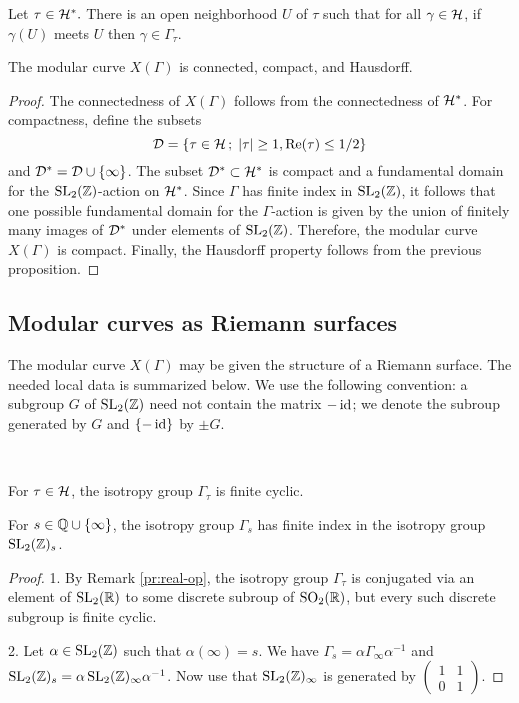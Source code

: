 \begin{cor} \label{pr:chart-nhood}
 Let $\tau\in\mathcal{H}^*.$ There is an open neighborhood $U$ of $\tau$ such that for all $\gamma\in\mathcal{H}$, if $\gamma(U)$ meets $U$ then $\gamma\in\Gamma_\tau$.
\end{cor}

\begin{prop}
 The modular curve $X(\Gamma)$ is connected, compact, and Hausdorff.
\end{prop}

\begin{proof}
 The connectedness of $X(\Gamma)$ follows from the connectedness of $\mathcal{H}^*$. For compactness, define the subsets
 \[\mathcal{D}=\{\tau\in\mathcal{H}\,;\; |\tau|\geq 1, \operatorname{Re}(\tau)\leq 1/2\}\] and $\mathcal{D}^*=\mathcal{D}\cup\{\infty\}$. The subset $\mathcal{D}^*\subset\mathcal{H}^*$ is compact and a fundamental domain for the $\operatorname{SL}_2(\mathbb{Z})$-action on $\mathcal{H}^*$. Since $\Gamma$ has finite index in $\operatorname{SL}_2(\mathbb{Z})$, it follows that one possible fundamental domain for the $\Gamma$-action is given by the union of finitely many images of $\mathcal{D}^*$ under elements of $\operatorname{SL}_2(\mathbb{Z})$. Therefore, the modular curve $X(\Gamma)$ is compact. Finally, the Hausdorff property follows from the previous proposition. 
\end{proof}

\subsection{Modular curves as Riemann surfaces}

The modular curve $X(\Gamma)$ may be given the structure of a Riemann surface. The needed local data is summarized below. We use the following convention: a subgroup $G$ of $\operatorname{SL}_2(\mathbb{Z})$ need not contain the matrix $-\operatorname{id}$; we denote the subroup generated by $G$ and $\{-\operatorname{id}\}$ by $\pm G$.

\begin{prop} \ 

  For $\tau\in\mathcal{H}$, the isotropy group $\Gamma_\tau$ is finite cyclic.
 
  For $s\in\mathbb{Q}\cup\{\infty\}$, the isotropy group $\Gamma_s$ has finite index in the isotropy group $\operatorname{SL}_2(\mathbb{Z})_s$.
\end{prop}

\begin{proof}

 1. By Remark \ref{pr:real-op}, the isotropy group $\Gamma_\tau$ is conjugated via an element of $\operatorname{SL}_2(\mathbb{R})$ to some discrete subroup of $\operatorname{SO}_2(\mathbb{R})$, but every such discrete subgroup is finite cyclic.
 
 2. Let $\alpha\in\operatorname{SL}_2(\mathbb{Z})$ such that $\alpha(\infty)=s$. We have $\Gamma_s = \alpha\Gamma_{\infty}\alpha^{-1}$ and $\operatorname{SL}_2(\mathbb{Z})_s=\alpha\operatorname{SL}_2(\mathbb{Z})_\infty\alpha^{-1}$. Now use that $\operatorname{SL}_2(\mathbb{Z})_\infty$ is generated by $\left(\begin{smallmatrix}1&1\\0&1\end{smallmatrix}\right)$.
\end{proof}


